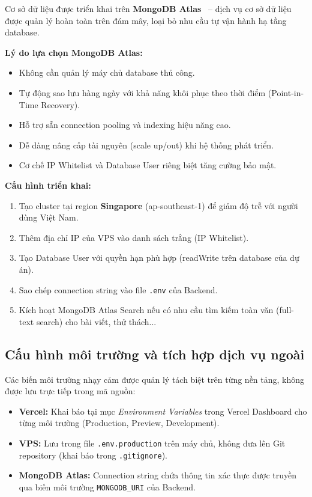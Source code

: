 Cơ sở dữ liệu được triển khai trên \textbf{MongoDB Atlas}~\cite{MongoDBAtlas} -- dịch vụ cơ sở dữ liệu được quản lý hoàn toàn trên đám mây, loại bỏ nhu cầu tự vận hành hạ tầng database.

\textbf{Lý do lựa chọn MongoDB Atlas:}
\begin{itemize}
    \item Không cần quản lý máy chủ database thủ công.
    \item Tự động sao lưu hàng ngày với khả năng khôi phục theo thời điểm (Point-in-Time Recovery).
    \item Hỗ trợ sẵn connection pooling và indexing hiệu năng cao.
    \item Dễ dàng nâng cấp tài nguyên (scale up/out) khi hệ thống phát triển.
    \item Cơ chế IP Whitelist và Database User riêng biệt tăng cường bảo mật.
\end{itemize}

\textbf{Cấu hình triển khai:}
\begin{enumerate}[leftmargin=1.5em]
    \item Tạo cluster tại region \textbf{Singapore} (ap-southeast-1) để giảm độ trễ với người dùng Việt Nam.
    \item Thêm địa chỉ IP của VPS vào danh sách trắng (IP Whitelist).
    \item Tạo Database User với quyền hạn phù hợp (readWrite trên database của dự án).
    \item Sao chép connection string vào file \texttt{.env} của Backend.
    \item Kích hoạt MongoDB Atlas Search nếu có nhu cầu tìm kiếm toàn văn (full-text search) cho bài viết, thử thách...
\end{enumerate}

\subsection{Cấu hình môi trường và tích hợp dịch vụ ngoài}
\label{subsec:deploy_env_config}

Các biến môi trường nhạy cảm được quản lý tách biệt trên từng nền tảng, không được lưu trực tiếp trong mã nguồn:

\begin{itemize}
    \item \textbf{Vercel:} Khai báo tại mục \textit{Environment Variables} trong Vercel Dashboard cho từng môi trường (Production, Preview, Development).
    \item \textbf{VPS:} Lưu trong file \texttt{.env.production} trên máy chủ, không đưa lên Git repository (khai báo trong \texttt{.gitignore}).
    \item \textbf{MongoDB Atlas:} Connection string chứa thông tin xác thực được truyền qua biến môi trường \texttt{MONGODB\_URI} của Backend.
\end{itemize}

